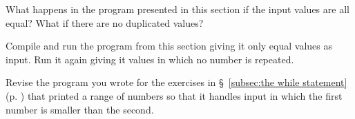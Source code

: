 %
%
\begin{question}
What happens in the program presented in this section if the
input values are all equal? What if there are no duplicated values?
\end{question}

\begin{question}
Compile and run the program from this section giving it only
equal values as input. Run it again giving it values in which no number is
repeated.
\end{question}

\begin{question}
Revise the program you wrote for the exercises in \S~\ref{subsec:the while statement} (p.
\pageref{subsec:the while statement}) that printed a range of numbers so that it handles input in which the first
number is smaller than the second.
\end{question}
